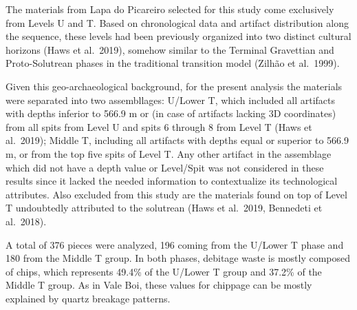 \documentclass[12pt,twoside]{reedthesis}
\begin{document}
The materials from Lapa do Picareiro selected for this study come exclusively from Levels U and T. Based on chronological data and artifact distribution along the sequence, these levels had been previously organized into two distinct cultural horizons (Haws et al.~2019), somehow similar to the Terminal Gravettian and Proto-Solutrean phases in the traditional transition model (Zilhão et al.~1999).

Given this geo-archaeological background, for the present analysis the materials were separated into two assembllages: U/Lower T, which included all artifacts with depths inferior to 566.9 m or (in case of artifacts lacking 3D coordinates) from all spits from Level U and spits 6 through 8 from Level T (Haws et al.~2019); Middle T, including all artifacts with depths equal or superior to 566.9 m, or from the top five spits of Level T. Any other artifact in the assemblage which did not have a depth value or Level/Spit was not considered in these results since it lacked the needed information to contextualize its technological attributes. Also excluded from this study are the materials found on top of Level T undoubtedly attributed to the solutrean (Haws et al.~2019, Bennedeti et al.~2018).

A total of 376 pieces were analyzed, 196 coming from the U/Lower T phase and 180 from the Middle T group. In both phases, debitage waste is mostly composed of chips, which represents 49.4\% of the U/Lower T group and 37.2\% of the Middle T group. As in Vale Boi, these values for chippage can be mostly explained by quartz breakage patterns.
\end{document}
